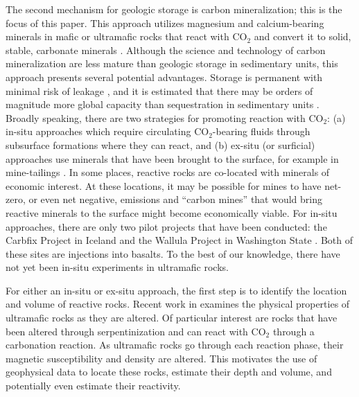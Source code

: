 \documentclass[
    paper,
  ]{geophysics}
\begin{document}
The second mechanism for geologic storage is carbon mineralization; this is the focus of this paper. This approach utilizes magnesium and calcium-bearing minerals in mafic or ultramafic rocks that react with CO$_2$ and convert it to solid, stable, carbonate minerals \citep{NationalAcademies2019, Seifritz1990, Lackner1995}. Although the science and technology of carbon mineralization are less mature than geologic storage in sedimentary units, this approach presents several potential advantages. Storage is permanent with minimal risk of leakage \citep{Zhang2017}, and it is estimated that there may be orders of magnitude more global capacity than sequestration in sedimentary units \citep{Kelemen2019}. Broadly speaking, there are two strategies for promoting reaction with CO$_2$: (a) in-situ approaches which require circulating CO$_2$-bearing fluids through subsurface formations where they can react, and (b) ex-situ (or surficial) approaches use minerals that have been brought to the surface, for example in mine-tailings \citep{NationalAcademies2019, Kelemen2019}. In some places, reactive rocks are co-located with minerals of economic interest. At these locations, it may be possible for mines to have net-zero, or even net negative, emissions and ``carbon mines'' that would bring reactive minerals to the surface might become economically viable. For in-situ approaches, there are only two pilot projects that have been conducted: the Carbfix Project in Iceland \citep{Gislason2018} and the Wallula Project in Washington State \citep{McGrail2014}. Both of these sites are injections into basalts. To the best of our knowledge, there have not yet been in-situ experiments in ultramafic rocks.

For either an in-situ or ex-situ approach, the first step is to identify the location and volume of reactive rocks. Recent work in \citep{Cutts2021, Mitchinson2020} examines the physical properties of ultramafic rocks as they are altered. Of particular interest are rocks that have been altered through serpentinization and can react with CO$_2$ through a carbonation reaction. As ultramafic rocks go through each reaction phase, their magnetic susceptibility and density are altered. This motivates the use of geophysical data to locate these rocks, estimate their depth and volume, and potentially even estimate their reactivity.
\end{document}
